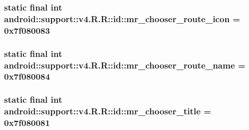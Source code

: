 \hypertarget{classandroid_1_1support_1_1v4_1_1_r_1_1id_b45bd8df81cdc3218b6b3a883d535e2a}{
\subsubsection[{mr\_\-chooser\_\-route\_\-icon}]{\setlength{\rightskip}{0pt plus 5cm}static final int android::support::v4.R.R::id::mr\_\-chooser\_\-route\_\-icon = 0x7f080083}}
\label{classandroid_1_1support_1_1v4_1_1_r_1_1id_b45bd8df81cdc3218b6b3a883d535e2a}


\hypertarget{classandroid_1_1support_1_1v4_1_1_r_1_1id_25b6c5de631ab068bc858453b8134f0c}{
\subsubsection[{mr\_\-chooser\_\-route\_\-name}]{\setlength{\rightskip}{0pt plus 5cm}static final int android::support::v4.R.R::id::mr\_\-chooser\_\-route\_\-name = 0x7f080084}}
\label{classandroid_1_1support_1_1v4_1_1_r_1_1id_25b6c5de631ab068bc858453b8134f0c}


\hypertarget{classandroid_1_1support_1_1v4_1_1_r_1_1id_700e72c038b676b32fb1fb0140142eb9}{
\subsubsection[{mr\_\-chooser\_\-title}]{\setlength{\rightskip}{0pt plus 5cm}static final int android::support::v4.R.R::id::mr\_\-chooser\_\-title = 0x7f080081}}
\label{classandroid_1_1support_1_1v4_1_1_r_1_1id_700e72c038b676b32fb1fb0140142eb9}


